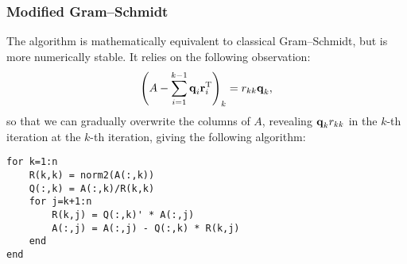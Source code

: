 \documentclass{article}
\begin{document}
\subsubsection{Modified Gram--Schmidt}
The algorithm is mathematically equivalent to classical Gram--Schmidt, but is more numerically stable. It relies on the following observation:
\begin{equation}
    \left(A-\sum_{i=1}^{k-1}\bm{\mathrm{q}}_i\bm{\mathrm{r}}_i^{\text{T}}\right)_k=r_{kk}\bm{\mathrm{q}}_k,
\end{equation}
so that we can gradually overwrite the columns of $A$, revealing $\bm{\mathrm{q}}_kr_{kk}$ in the $k$-th iteration at the $k$-th iteration, giving the following algorithm:
\begin{verbatim}
for k=1:n
    R(k,k) = norm2(A(:,k))
    Q(:,k) = A(:,k)/R(k,k)
    for j=k+1:n
        R(k,j) = Q(:,k)' * A(:,j)
        A(:,j) = A(:,j) - Q(:,k) * R(k,j)
    end
end
\end{verbatim}
\end{document}

